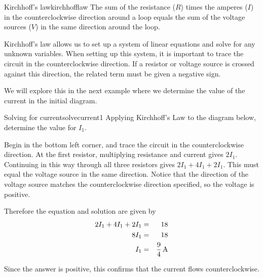 \begin{theorem}{Kirchhoff's law}{kirchhofflaw}
The sum of the resistance ($R$) times the amperes ($I$) in the counterclockwise direction
around a loop equals the sum of the voltage sources ($V$) in the same direction
around the loop.
\end{theorem}

Kirchhoff's law allows us to set up a system of linear equations and solve for any unknown variables. When setting up this system, it is important to trace the circuit in the counterclockwise direction. If a resistor or voltage source is crossed against this direction, the related term must be given a negative sign. 

We will explore this in the next example where we determine the value of the current in the initial diagram.

\begin{example}{Solving for current}{solvecurrent1}
Applying Kirchhoff's Law to the diagram below, determine the value for $I_1$. 

\begin{center}
\end{center}

\end{example}

\begin{solution}
Begin in the bottom left corner, and trace the circuit in the counterclockwise direction. At the first resistor, multiplying resistance and current gives $2I_1$. Continuing in this way through all three resistors gives $2I_1 + 4I_1 + 2 I_1$. This must equal the voltage source in the same direction. Notice that the direction of the voltage source matches the counterclockwise direction specified, so the voltage is positive. 

Therefore the equation and solution are given by
\begin{eqnarray*}
2I_1 + 4I_1 + 2 I_1 &=& 18 \\
8I_1 &=& 18 \\
I_1 &=& \frac{9}{4} \mathop{\textrm{\rm A}}\nolimits
\end{eqnarray*}

Since the answer is positive, this confirms that the current flows counterclockwise. 
\end{solution}

